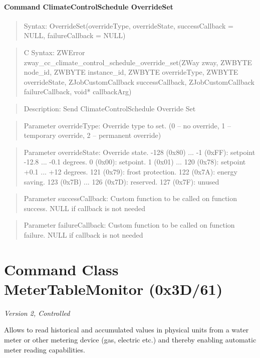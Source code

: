 \paragraph{Command ClimateControlSchedule OverrideSet}
\begin{quote}Syntax: OverrideSet(overrideType, overrideState, successCallback = NULL, failureCallback = NULL)\end{quote}
\begin{quote}C Syntax: ZWError zway\_cc\_climate\_control\_schedule\_override\_set(ZWay zway, ZWBYTE node\_id, ZWBYTE instance\_id, ZWBYTE overrideType, ZWBYTE overrideState, ZJobCustomCallback successCallback, ZJobCustomCallback failureCallback, void* callbackArg)\end{quote}
\begin{quote}Description: Send ClimateControlSchedule Override Set\end{quote}
\begin{quote}Parameter overrideType: Override type to set. (0 – no override, 1 – temporary override, 2 – permanent override)\end{quote}
\begin{quote}Parameter overrideState: Override state. -128 (0x80) ... -1 (0xFF): setpoint -12.8 ... -0.1 degrees. 0 (0x00): setpoint. 1 (0x01) ... 120 (0x78): setpoint +0.1 ... +12 degrees. 121 (0x79): frost protection. 122 (0x7A): energy saving. 123 (0x7B) ... 126 (0x7D): reserved. 127 (0x7F): unused\end{quote}
\begin{quote}Parameter successCallback: Custom function to be called on function success. NULL if callback is not needed\end{quote}
\begin{quote}Parameter failureCallback: Custom function to be called on function failure. NULL if callback is not needed\end{quote}



\section{Command Class MeterTableMonitor (0x3D/61)}

\textit{Version 2, Controlled}
\newline

Allows to read historical and accumulated values in physical units from a water meter or other metering device (gas, electric etc.) and thereby enabling automatic meter reading capabilities.
\newline

